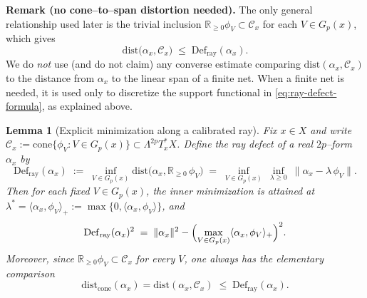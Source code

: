\documentclass[11pt]{article}
\numberwithin{equation}{section}  %
\theoremstyle{plain}
\newtheorem{lemma}[theorem]{Lemma}
\theoremstyle{definition}
\theoremstyle{remark}
\newcommand{\R}{\mathbb{R}}
\newcommand{\dist}{\mathrm{dist}}
\newcommand{\Def}{\mathrm{Def}}
\newcommand{\cone}{\mathrm{cone}}
\newcommand{\distcone}{\dist_{\cone}}        %
\newcommand{\Gp}{G_p}
\begin{document}
\smallskip\noindent\textbf{Remark (no cone--to--span distortion needed).}
The only general relationship used later is the trivial inclusion
$\R_{\ge 0}\phi_{V}\subset \mathcal{C}_{x}$ for each $V\in\Gp(x)$, which gives
\[
\dist\bigl(\alpha_{x},\mathcal{C}_{x}\bigr)\;\le\;\Def_{\mathrm{ray}}(\alpha_{x}).
\]
We do \emph{not} use (and do not claim) any converse estimate comparing
$\dist(\alpha_{x},\mathcal{C}_{x})$ to the distance from $\alpha_{x}$ to the
linear span of a finite net.  When a finite net is needed, it is used only
to discretize the support functional in \eqref{eq:ray-defect-formula}, as explained above.







\begin{lemma}[Explicit minimization along a calibrated ray]
\label{lem:radial-min}
Fix $x\in X$ and write $\mathcal{C}_{x}:=\mathrm{cone}\{\phi_{V}:V\in\Gp(x)\}\subset \Lambda^{2p}T_x^*X$.
Define the \emph{ray defect} of a real $2p$--form $\alpha_{x}$ by
\[
\Def_{\mathrm{ray}}(\alpha_{x})
\;:=\;
\inf_{V\in\Gp(x)} \dist\bigl(\alpha_{x},\R_{\ge 0}\,\phi_{V}\bigr)
\;=\;
\inf_{V\in\Gp(x)}\ \inf_{\lambda\ge 0}\ \|\alpha_{x}-\lambda\,\phi_{V}\|.
\]
Then for each fixed $V\in\Gp(x)$, the inner minimization is attained at
$\lambda^{*}=\langle \alpha_{x},\phi_{V}\rangle_{+}:=\max\{0,\langle \alpha_{x},\phi_{V}\rangle\}$, and
\begin{equation}\label{eq:ray-defect-formula}
\Def_{\mathrm{ray}}(\alpha_{x})^{2}
\;=\;
\|\alpha_{x}\|^{2}
-
\Bigl(
\max_{V\in \Gp(x)} \langle \alpha_{x},\phi_{V}\rangle_{+}
\Bigr)^{2}.
\end{equation}
Moreover, since $\R_{\ge 0}\phi_{V}\subset \mathcal{C}_{x}$ for every $V$,
one always has the elementary comparison
\[
\distcone(\alpha_{x})=\dist(\alpha_{x},\mathcal{C}_{x})
\;\le\;
\Def_{\mathrm{ray}}(\alpha_{x}).
\]
\end{lemma}
\end{document}
